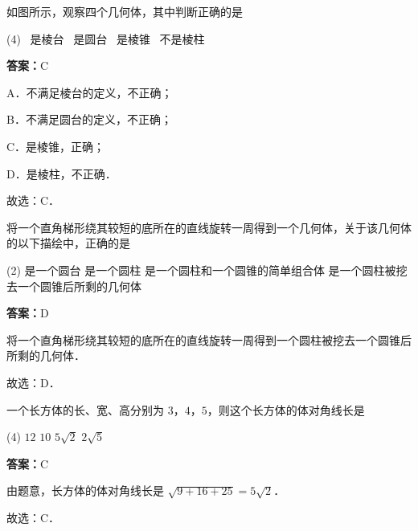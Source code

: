 \vspace{2em}


\begin{example}[\bkstar{2}{5}]
如图所示，观察四个几何体，其中判断正确的是
\begin{tasks}(4)
    \task \raisebox{-.5\height}{\resizebox{0.12\textwidth}{!}{}}\ 是棱台
    \task \raisebox{-.5\height}{\resizebox{0.08\textwidth}{!}{}}\ 是圆台
    \task \raisebox{-.5\height}{\resizebox{0.1\textwidth}{!}{}}\ 是棱锥
    \task \raisebox{-.5\height}{\resizebox{0.12\textwidth}{!}{}}\ 不是棱柱
\end{tasks}
\end{example}
\begin{solution}
\textbf{答案：}C

A．不满足棱台的定义，不正确；

B．不满足圆台的定义，不正确；

C．是棱锥，正确；

D．是棱柱，不正确．

故选：C．
\end{solution}

\vspace{2em}

\begin{example}[\bkstar{2}{5}]
将一个直角梯形绕其较短的底所在的直线旋转一周得到一个几何体，关于该几何体的以下描绘中，正确的是
\begin{tasks}(2)
    \task 是一个圆台
    \task 是一个圆柱
    \task 是一个圆柱和一个圆锥的简单组合体
    \task 是一个圆柱被挖去一个圆锥后所剩的几何体
\end{tasks}
\end{example}
\begin{solution}
\textbf{答案：}D

将一个直角梯形绕其较短的底所在的直线旋转一周得到一个圆柱被挖去一个圆锥后所剩的几何体．

故选：D．
\end{solution}

\vspace{2em}


\begin{example}[\bkstar{2}{5}]
一个长方体的长、宽、高分别为 $3$，$4$，$5$，则这个长方体的体对角线长是
\begin{tasks}(4)
    \task $12$
    \task $10$
    \task $5\sqrt{2}$
    \task $2\sqrt{5}$
\end{tasks}
\end{example}
\begin{solution}
\textbf{答案：}C

由题意，长方体的体对角线长是 $\sqrt{9+16+25}=5\sqrt{2}$．

故选：C．
\end{solution}

